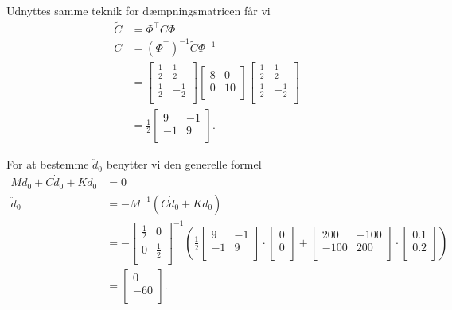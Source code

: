 \begin{derivation}
  Udnyttes samme teknik for dæmpningsmatricen får vi
  \begin{align*}
    \tilde{C} &= \Phi^{\intercal} C \Phi \\
    C &= \left( \Phi^{\intercal} \right)^{-1} \tilde{C} \Phi^{-1} \\
      &= \begin{bmatrix}
      \frac{1}{2} & \frac{1}{2}\\
      \frac{1}{2} & - \frac{1}{2}\\
      \end{bmatrix} \begin{bmatrix}
      8 & 0\\
      0 & 10\\
      \end{bmatrix} \begin{bmatrix}
      \frac{1}{2} & \frac{1}{2}\\
      \frac{1}{2} & -\frac{1}{2}\\
      \end{bmatrix} \\
      &= \frac{1}{2} \begin{bmatrix}
      9 & -1\\
      -1 & 9\\
      \end{bmatrix}
  .\end{align*}
  
  For at bestemme $\ddot{d}_0$ benytter vi den generelle formel
  \begin{align*}
    M \ddot{d}_0 + C \dot{d}_0 + K d_0 &= 0 \\
    \ddot{d}_0 &= - M^{-1} \left( C \dot{d}_0 + K d_0 \right) \\
     &= - \begin{bmatrix}
     \frac{1}{2} & 0\\
     0 & \frac{1}{2}\\
     \end{bmatrix}^{-1} \left( \frac{1}{2} \begin{bmatrix}
     9 & -1\\
     -1 & 9\\
     \end{bmatrix} \cdot \begin{bmatrix}
     0 \\
     0 \\
     \end{bmatrix} + \begin{bmatrix}
     200 & -100\\
     -100 & 200\\
     \end{bmatrix} \cdot \begin{bmatrix}
     \num{0,1} \\
     \num{0,2} \\
     \end{bmatrix}\right) \\
     &= \begin{bmatrix}
     0\\
     -60\\
     \end{bmatrix}
  .\end{align*}
  

\end{derivation}
